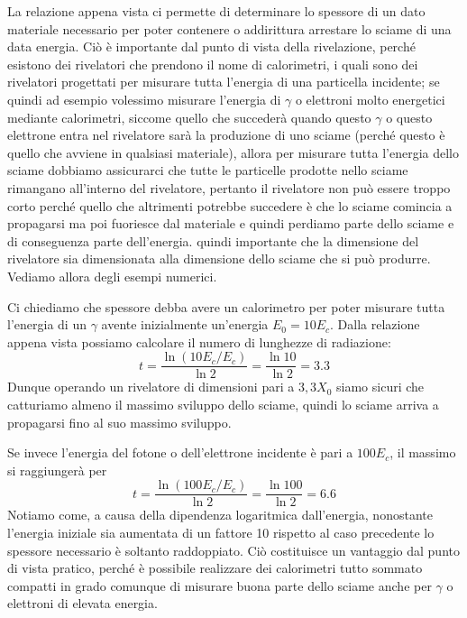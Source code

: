 \begin{esempio}
    La relazione appena vista ci permette di determinare lo spessore di un dato materiale necessario per poter contenere o addirittura arrestare lo sciame di una data energia. Ciò è importante dal punto di vista della rivelazione, perché esistono dei rivelatori che prendono il nome di calorimetri, i quali sono dei rivelatori progettati per misurare tutta l'energia di una particella incidente; se quindi ad esempio volessimo misurare l'energia di $\gamma$ o elettroni molto energetici mediante calorimetri, siccome quello che succederà quando questo $\gamma$ o questo elettrone entra nel rivelatore sarà la produzione di uno sciame (perché questo è quello che avviene in qualsiasi materiale), allora per misurare tutta l'energia dello sciame dobbiamo assicurarci che tutte le particelle prodotte nello sciame rimangano all'interno del rivelatore, pertanto il rivelatore non può essere troppo corto perché quello che altrimenti potrebbe succedere è che lo sciame comincia a propagarsi ma poi fuoriesce dal materiale e quindi perdiamo parte dello sciame e di conseguenza parte dell'energia. \E quindi importante che la dimensione del rivelatore sia dimensionata alla dimensione dello sciame che si può produrre. Vediamo allora degli esempi numerici.

    Ci chiediamo che spessore debba avere un calorimetro per poter misurare tutta l'energia di un $\gamma$ avente inizialmente un'energia $E_0=10E_c$. Dalla relazione appena vista possiamo calcolare il numero di lunghezze di radiazione:
    \begin{equation*}
        t=\frac{\ln (10E_c/E_c)}{\ln 2}=\frac{\ln 10}{\ln 2}=3.3
    \end{equation*}
    Dunque operando un rivelatore di dimensioni pari a $3,3X_0$ siamo sicuri che catturiamo almeno il massimo sviluppo dello sciame, quindi lo sciame arriva a propagarsi fino al suo massimo sviluppo\footnotemark.

    Se invece l'energia del fotone o dell'elettrone incidente è pari a $100E_c$, il massimo si raggiungerà per
    \begin{equation*}
        t=\frac{\ln (100E_c/E_c)}{\ln 2}=\frac{\ln 100}{\ln 2}=6.6
    \end{equation*}
    Notiamo come, a causa della dipendenza logaritmica dall'energia, nonostante l'energia iniziale sia aumentata di un fattore 10 rispetto al caso precedente lo spessore necessario è soltanto raddoppiato. Ciò costituisce un vantaggio dal punto di vista pratico, perché è possibile realizzare dei calorimetri tutto sommato compatti in grado comunque di misurare buona parte dello sciame anche per $\gamma$ o elettroni di elevata energia.
\end{esempio}

